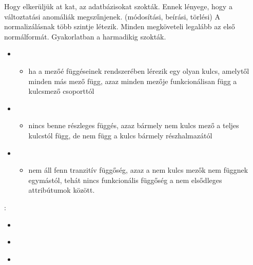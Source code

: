 \documentclass[main.tex]{subfiles}
\begin{document}
  Hogy elkerüljük at kat, az adatbázisokat
   szokták. Ennek lényege, hogy a
  változtatási anomáliák megszűnjenek. (módosítási, beírási,
  törlési) A normalizálásnak több szintje létezik.
  Minden  megköveteli legalább
  az első normálformát. Gyakorlatban a harmadikig szokták.
  \begin{itemize}
    \item {}
    \begin{itemize}
      \item ha a mezőé függéseinek rendszerében
      lérezik egy olyan kulcs, amelytől minden
      más mező függ, azaz minden mezője 
      funkcionálisan függ a kulcsmező csoporttól
    \end{itemize}
    
    \item {}
    \begin{itemize}
      \item nincs benne részleges függés, azaz bármely nem
      kulcs mező a teljes kulcstól függ, de nem függ a
      kulcs bármely részhalmazától
    \end{itemize}

    \item {}
    \begin{itemize}
      \item nem áll fenn tranzitív függőség, azaz
      a nem kulcs mezők nem függnek egymástól,
      tehát nincs funkcionális függőség a nem
      elsődleges attribútumok között.
    \end{itemize}
  \end{itemize}

  {\large {}}:
  \begin{itemize}
    \item {} 
    \\ \hspace*{\fill}

    \item {} 
    \\ \hspace*{\fill}

    \item {} 
     
    \\ \hspace*{\fill}
  \end{itemize}
\end{document}
